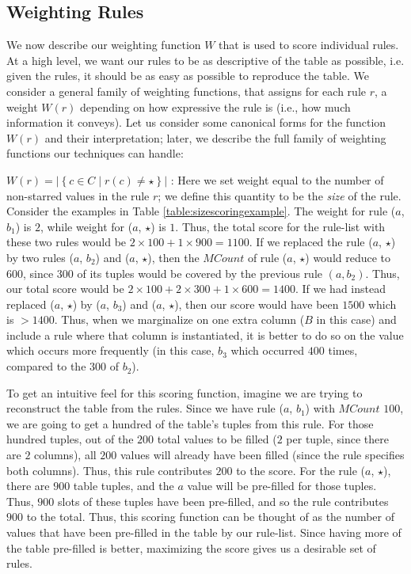 \subsection{Weighting Rules}
\label{sec:weighting}
We now describe our weighting function $W$ that is used to score individual rules. 
At a high level, we want our rules to be as descriptive of the table as possible, i.e. given the rules, it should be as easy as possible to reproduce the table. We consider a general family of weighting functions, that assigns for each rule $r$, a weight $W(r)$ depending on how expressive the rule is (i.e., how much information
it conveys). Let us consider some canonical forms for the function $W(r)$ and their interpretation; later, we describe the full
family of weighting functions our techniques can handle:

$W(r) = |\left\lbrace c \in C \mid r(c) \neq \star \right\rbrace |$ : 
Here we set weight equal to the number of non-starred values in the rule $r$; we define this quantity to be the {\em size} of the rule. Consider the examples in Table \ref{table:sizescoringexample}. The weight for rule ($a$, $b_1$) is $2$, while weight for ($a$, $\star$) is $1$. Thus, the total score for the rule-list with these two rules would be $2 \times 100 + 1 \times 900 = 1100$. If we replaced the rule ($a$, $\star$) by two rules ($a$, $b_2$) and ($a$, $\star$), then the $MCount$ of rule ($a$, $\star$) would reduce to $600$, since $300$ of its tuples would be covered by the previous rule $(a, b_2)$. Thus, our total score would be $2 \times 100 + 2 \times 300 + 1 \times 600 = 1400$. If we had instead replaced ($a$, $\star$) by ($a$, $b_3$) and ($a$, $\star$), then our score would have been $1500$ which is $> 1400$. Thus, when we marginalize on one extra column ($B$ in this case) and include a rule where that column is instantiated, it is better to do so on the value which occurs more frequently (in this case, $b_3$ which occurred $400$ times, compared to the $300$ of $b_2$). 

To get an intuitive feel for this scoring function, imagine we are trying to reconstruct the table from the rules. Since we have rule ($a$, $b_1$) with $MCount$ $100$, we are going to get a hundred of the table's tuples from this rule. For those hundred tuples, out of the $200$ total values to be filled ($2$ per tuple, since there are $2$ columns), all $200$ values will already have been filled (since the rule specifies both columns). Thus, this rule contributes $200$ to the score. For the rule ($a$, $\star$), there are $900$ table tuples, and the $a$ value will be pre-filled for those tuples. Thus, $900$ slots of these tuples have been pre-filled, and so the rule contributes $900$ to the total. Thus, this scoring function can be thought of as the number of values that have been pre-filled in the table by our rule-list. Since having more of the table pre-filled is better, maximizing the score gives us a desirable set of rules.

